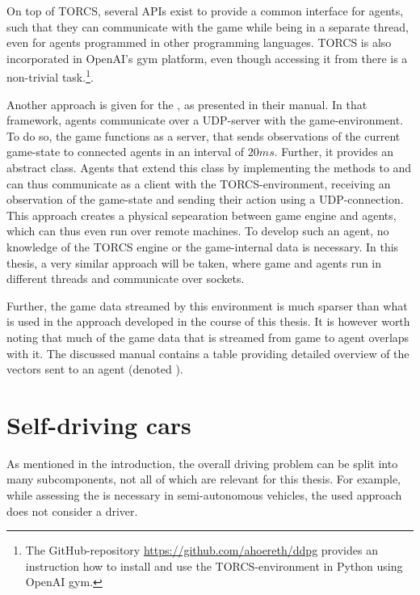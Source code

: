 On top of TORCS, several APIs exist to provide a common interface for agents, such that they can communicate with the game while being in a separate thread, even for agents programmed in other programming languages. TORCS is also incorporated in OpenAI's gym platform, even though accessing it from there is a non-trivial task.\footnote{The GitHub-repository \url{https://github.com/ahoereth/ddpg} provides an instruction how to install and use the TORCS-environment in Python using OpenAI gym.}. 

Another approach is given for the , as presented in their manual\cite{loiacono_simulated_2013}. In that framework, agents communicate over a UDP-server with the game-environment. To do so, the game functions as a server, that sends observations of the current game-state to connected agents in an interval of $20ms$. Further, it provides an abstract  class. Agents that extend this class by implementing the methods to  and  can thus communicate as a client with the TORCS-environment, receiving an observation of the game-state and sending their action using a UDP-connection. This approach creates a physical sepearation between game engine and agents, which can thus even run over remote machines. To develop such an agent, no knowledge of the TORCS engine or the game-internal data is necessary. In this thesis, a very similar approach will be taken, where game and agents run in different threads and communicate over sockets. 

Further, the game data streamed by this environment is much sparser than what is used in the approach developed in the course of this thesis. It is however worth noting that much of the game data that is streamed from game to agent overlaps with it. The discussed manual \cite{loiacono_simulated_2013} contains a table providing detailed overview of the vectors sent to an agent (denoted ).

\section{Self-driving cars}

As mentioned in the introduction, the overall driving problem can be split into many subcomponents, not all of which are relevant for this thesis. For example, while assessing the  is necessary in semi-autonomous vehicles, the used approach does not consider a driver. 

